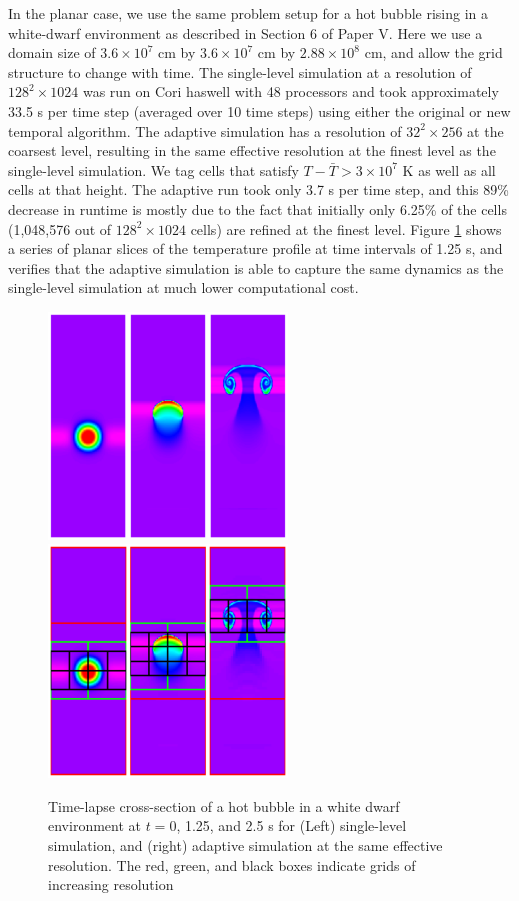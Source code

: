 In the planar case, we use the same problem setup for a hot bubble rising in a white-dwarf environment as described in Section 6 of Paper V. Here we use a domain size of $3.6\times 10^7$ cm by $3.6\times 10^7$ cm by $2.88\times 10^8$ cm, and allow the grid structure to change with time. The single-level simulation at a resolution of $128^2 \times 1024$ was run on Cori haswell with 48 processors and took approximately 33.5 s per time step (averaged over 10 time steps) using either the original or new temporal algorithm. The adaptive simulation has a resolution of $32^2 \times 256$ at the coarsest level, resulting in the same effective resolution at the finest level as the single-level simulation. We tag cells that satisfy $T-\bar{T} > 3\times 10^7$ K as well as all cells at that height. The adaptive run took only 3.7 s per time step, and this 89\% decrease in runtime is mostly due to the fact that initially only 6.25\% of the cells (1,048,576 out of $128^2 \times 1024$ cells) are refined at the finest level. Figure \ref{fig:bubble_results} shows a series of planar slices of the temperature profile at time intervals of 1.25 s, and verifies that the adaptive simulation is able to capture the same dynamics as the single-level simulation at much lower computational cost.

\begin{figure}[htb]
\begin{center}
\includegraphics[width=2.5in]{./figs/reacting_bubble_result} \hspace{2.5em}
\includegraphics[width=2.5in]{./figs/reacting_bubble_amr_result}
\caption{\label{fig:bubble_results} Time-lapse cross-section of a hot bubble in a white dwarf environment at
         $t = 0$, 1.25, and 2.5 s for (Left) single-level simulation, and
         (right) adaptive simulation at the same effective resolution.  The red, green, and black boxes indicate grids of increasing resolution}
\end{center}
\end{figure}

